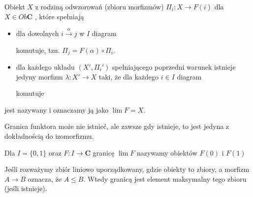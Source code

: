 \begin{definition}
  Obiekt $X$ z rodziną odwzorowań (zbioru morfizmów) $\Pi_i:X\to F(i)$ dla $X\in Ob\mathbf{C}$ , które spełniają
  \begin{itemize}
    \item \acc{[zgodność]} dla dowolnych $i\xrightarrow{\alpha}j$ w $I$ diagram
      \begin{center}\end{center}
      komutuje, tzn. $\Pi_j=F(\alpha)\circ\Pi_i$.
    \item \acc{[uniwersalność]} dla każdego układu $(X',\Pi_i')$ spełniającego poprzedni warunek istnieje jedyny morfizm $\lambda:X'\to X$ taki, że dla każdego $i\in I$ diagram
      \begin{center}\end{center}
    komutuje
  \end{itemize}
  jest nazywany  i oznaczamy ją jako $\lim F=X$.
\end{definition}

Granica funktora może nie istnieć, ale zawsze gdy istnieje, to jest jedyna z dokładnością do izomorfizmu.

\begin{example}
  \item Dla $I=\{0,1\}$ oraz $F:I\to \mathbf{C}$ granicę $\lim F$ nazywamy  obiektów $F(0)$ i $F(1)$
    \begin{center}\end{center}
  \item Jeśli rozważymy zbiór liniowo uporządkowany, gdzie obiekty to zbiory, a morfizm $A\to B$ oznacza, że $A\leq B$. Wtedy granicą jest element maksymalny tego zbioru (jeśli istnieje).
\end{example}

